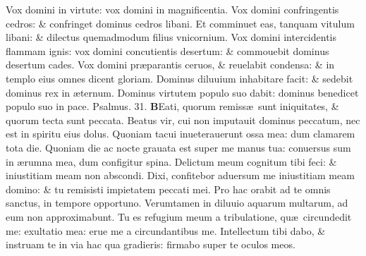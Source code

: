 \documentclass[a5paper,10pt]{book}
\def\ae{æ}
\begin{document}
\begin{multicols*}{2}
\newline \color{red} V\color{black}ox domini in virtute: vox domini in magnificentia.
\newline \color{red} V\color{black}ox domini confringentis cedros: \& confringet dominus cedros libani.
\newline \color{red} E\color{black}t comminuet eas, tanquam vitulum libani: \& dilectus quemadmodum filius vnicornium.
\newline \color{red} V\color{black}ox domini intercidentis flammam ignis: vox domini concutientis desertum: \& commouebit dominus desertum cades.
\newline \color{red} V\color{black}ox domini pr\ae parantis ceruos, \& reuelabit condensa: \& in templo eius omnes dicent gloriam.
\newline \color{red} D\color{black}ominus diluuium inhabitare facit: \& sedebit dominus rex in \ae ternum.
\newline \color{red} D\color{black}ominus virtutem populo suo dabit: dominus benedicet populo suo in pace.
\newline \color{red} Psalmus. \hypertarget{ps31}{31.} \color{black}
\vspace{-1em}
\lettrine[lines=2]{\bfseries \color{red} B}{}Eati, quorum remiss\ae \ sunt iniquitates, \& quorum tecta sunt peccata.
\newline \color{red} B\color{black}eatus vir, cui non imputauit dominus peccatum, nec est in spiritu eius dolus.
\newline \color{red} Q\color{black}uoniam tacui inueterauerunt ossa mea: dum clamarem tota die.
\newline \color{red} Q\color{black}uoniam die ac nocte grauata est super me manus tua: conuersus sum in \ae rumna mea, dum configitur spina.
\newline \color{red} D\color{black}elictum meum cognitum tibi feci: \& iniustitiam meam non abscondi.
\newline \color{red} D\color{black}ixi, confitebor aduersum me iniustitiam meam domino: \& tu remisisti impietatem peccati mei.
\newline \color{red} P\color{black}ro hac orabit ad te omnis sanctus, in tempore opportuno.
\newline \color{red} V\color{black}erumtamen in diluuio aquarum multarum, ad eum non approximabunt.
\newline \color{red} T\color{black}u es refugium meum a tribulatione, qu\ae \ circundedit me: exultatio mea: erue me a circundantibus me.
\newline \color{red} I\color{black}ntellectum tibi dabo, \& instruam te in via hac qua gradieris: firmabo super te oculos meos.

\end{multicols*}
\end{document}
